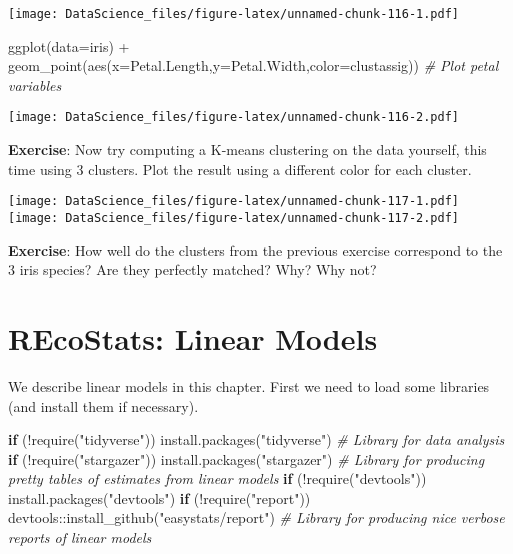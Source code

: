 \documentclass[
]{book}
\newenvironment{Shaded}{\begin{snugshade}}{\end{snugshade}}
\newcommand{\AttributeTok}[1]{\textcolor[rgb]{0.77,0.63,0.00}{#1}}
\newcommand{\CommentTok}[1]{\textcolor[rgb]{0.56,0.35,0.01}{\textit{#1}}}
\newcommand{\ControlFlowTok}[1]{\textcolor[rgb]{0.13,0.29,0.53}{\textbf{#1}}}
\newcommand{\FunctionTok}[1]{\textcolor[rgb]{0.00,0.00,0.00}{#1}}
\newcommand{\NormalTok}[1]{#1}
\newcommand{\SpecialCharTok}[1]{\textcolor[rgb]{0.00,0.00,0.00}{#1}}
\newcommand{\StringTok}[1]{\textcolor[rgb]{0.31,0.60,0.02}{#1}}
\begin{document}
\texttt{[image: DataScience\_files/figure-latex/unnamed-chunk-116-1.pdf]}

\begin{Shaded}
\begin{Highlighting}[]
\FunctionTok{ggplot}\NormalTok{(}\AttributeTok{data=}\NormalTok{iris) }\SpecialCharTok{+} \FunctionTok{geom\_point}\NormalTok{(}\FunctionTok{aes}\NormalTok{(}\AttributeTok{x=}\NormalTok{Petal.Length,}\AttributeTok{y=}\NormalTok{Petal.Width,}\AttributeTok{color=}\NormalTok{clustassig)) }\CommentTok{\# Plot petal variables}
\end{Highlighting}
\end{Shaded}

\texttt{[image: DataScience\_files/figure-latex/unnamed-chunk-116-2.pdf]}

\textbf{Exercise}: Now try computing a K-means clustering on the data yourself, this time using 3 clusters. Plot the result using a different color for each cluster.

\texttt{[image: DataScience\_files/figure-latex/unnamed-chunk-117-1.pdf]} \texttt{[image: DataScience\_files/figure-latex/unnamed-chunk-117-2.pdf]}

\textbf{Exercise}: How well do the clusters from the previous exercise correspond to the 3 iris species? Are they perfectly matched? Why? Why not?

\hypertarget{recostats-linear-models}{%
\chapter{REcoStats: Linear Models}\label{recostats-linear-models}}

We describe linear models in this chapter. First we need to load some libraries (and install them if necessary).

\begin{Shaded}
\begin{Highlighting}[]
\ControlFlowTok{if}\NormalTok{ (}\SpecialCharTok{!}\FunctionTok{require}\NormalTok{(}\StringTok{"tidyverse"}\NormalTok{)) }\FunctionTok{install.packages}\NormalTok{(}\StringTok{"tidyverse"}\NormalTok{) }\CommentTok{\# Library for data analysis}
\ControlFlowTok{if}\NormalTok{ (}\SpecialCharTok{!}\FunctionTok{require}\NormalTok{(}\StringTok{"stargazer"}\NormalTok{)) }\FunctionTok{install.packages}\NormalTok{(}\StringTok{"stargazer"}\NormalTok{) }\CommentTok{\# Library for producing pretty tables of estimates from linear models}
\ControlFlowTok{if}\NormalTok{ (}\SpecialCharTok{!}\FunctionTok{require}\NormalTok{(}\StringTok{"devtools"}\NormalTok{)) }\FunctionTok{install.packages}\NormalTok{(}\StringTok{"devtools"}\NormalTok{)}
\ControlFlowTok{if}\NormalTok{ (}\SpecialCharTok{!}\FunctionTok{require}\NormalTok{(}\StringTok{"report"}\NormalTok{)) devtools}\SpecialCharTok{::}\FunctionTok{install\_github}\NormalTok{(}\StringTok{"easystats/report"}\NormalTok{) }\CommentTok{\# Library for producing nice verbose reports of linear models}
\end{Highlighting}
\end{Shaded}
\end{document}
